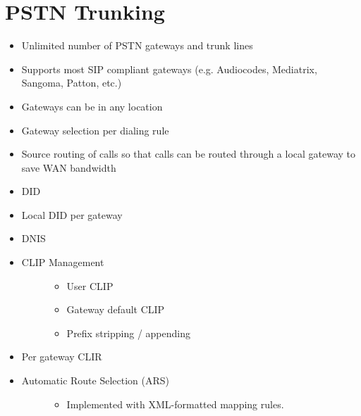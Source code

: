 \documentclass[letterpaper,10pt,english]{sphinxmanual}
\begin{document}
\section{PSTN Trunking}
\label{\detokenize{features:pstn-trunking}}\begin{itemize}
\item {} 
Unlimited number of PSTN gateways and trunk lines

\item {} 
Supports most SIP compliant gateways (e.g. Audiocodes, Mediatrix, Sangoma, Patton, etc.)

\item {} 
Gateways can be in any location

\item {} 
Gateway selection per dialing rule

\item {} 
Source routing of calls so that calls can be routed through a local gateway to save WAN bandwidth

\item {} 
DID

\item {} 
Local DID per gateway

\item {} 
DNIS

\item {} \begin{description}
\item[{CLIP Management}] \leavevmode\begin{itemize}
\item {} 
User CLIP

\item {} 
Gateway default CLIP

\item {} 
Prefix stripping / appending

\end{itemize}

\end{description}

\item {} 
Per gateway CLIR

\item {} \begin{description}
\item[{Automatic Route Selection (ARS)}] \leavevmode\begin{itemize}
\item {} 
Implemented with XML-formatted mapping rules.


\end{itemize}
\end{description}
\end{itemize}
\end{document}
